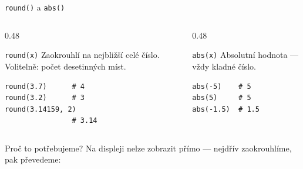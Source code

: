 \begin{frame}[fragile]{\texttt{round()} a \texttt{abs()}}

  \begin{columns}[T]
    \begin{column}{0.48\textwidth}
      \begin{block}{\texttt{round(x)}}
        Zaokrouhlí  na nejbližší celé číslo.
        Volitelně: počet desetinných míst.
        \begin{lstlisting}
round(3.7)      # 4
round(3.2)      # 3
round(3.14159, 2)
                # 3.14
        \end{lstlisting}
      \end{block}
    \end{column}
    \begin{column}{0.48\textwidth}
      \begin{block}{\texttt{abs(x)}}
        Absolutní hodnota — vždy kladné číslo.
        \begin{lstlisting}
abs(-5)    # 5
abs(5)     # 5
abs(-1.5)  # 1.5
        \end{lstlisting}
      \end{block}
    \end{column}
  \end{columns}

  \bigskip
  \begin{exampleblock}{Proč to potřebujeme?}
    Na displeji nelze zobrazit  přímo — nejdřív zaokrouhlíme,
    pak převedeme: 
  \end{exampleblock}
\end{frame}

